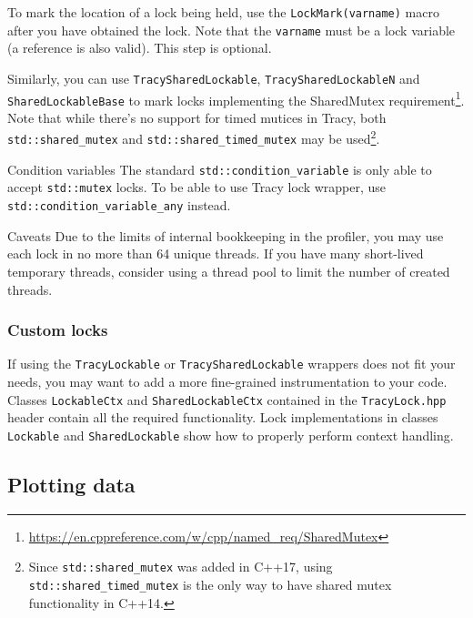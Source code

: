 \documentclass[hidelinks,titlepage,a4paper,twoside]{article}
\begin{document}
To mark the location of a lock being held, use the \texttt{LockMark(varname)} macro after you have obtained the lock. Note that the \texttt{varname} must be a lock variable (a reference is also valid). This step is optional.

Similarly, you can use \texttt{TracySharedLockable}, \texttt{TracySharedLockableN} and \texttt{SharedLockableBase} to mark locks implementing the SharedMutex requirement\footnote{\url{https://en.cppreference.com/w/cpp/named_req/SharedMutex}}. Note that while there's no support for timed mutices in Tracy, both \texttt{std::shared\_mutex} and \texttt{std::shared\_timed\_mutex} may be used\footnote{Since \texttt{std::shared\_mutex} was added in C++17, using \texttt{std::shared\_timed\_mutex} is the only way to have shared mutex functionality in C++14.}.

\begin{bclogo}[
noborder=true,
couleur=black!5,
logo=\bclampe
]{Condition variables}
The standard \texttt{std::condition\_variable} is only able to accept \texttt{std::mutex} locks. To be able to use Tracy lock wrapper, use \texttt{std::condition\_variable\_any} instead.
\end{bclogo}

\begin{bclogo}[
noborder=true,
couleur=black!5,
logo=\bcattention
]{Caveats}
Due to the limits of internal bookkeeping in the profiler, you may use each lock in no more than 64 unique threads. If you have many short-lived temporary threads, consider using a thread pool to limit the number of created threads.
\end{bclogo}

\subsubsection{Custom locks}

If using the \texttt{TracyLockable} or \texttt{TracySharedLockable} wrappers does not fit your needs, you may want to add a more fine-grained instrumentation to your code. Classes \texttt{LockableCtx} and \texttt{SharedLockableCtx} contained in the \texttt{TracyLock.hpp} header contain all the required functionality. Lock implementations in classes \texttt{Lockable} and \texttt{SharedLockable} show how to properly perform context handling.

\subsection{Plotting data}
\label{plottingdata}
\end{document}
